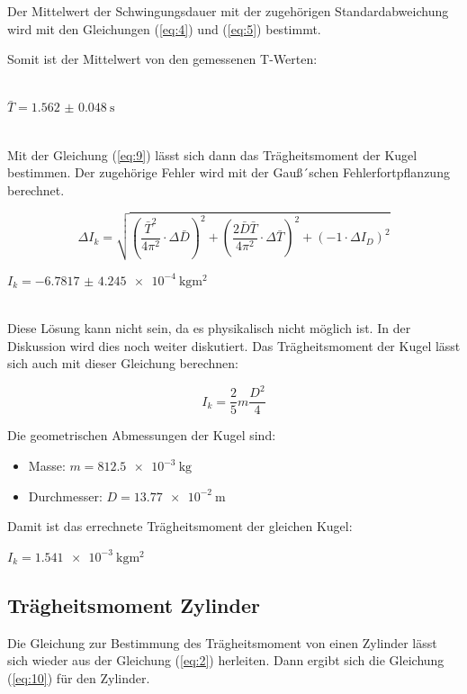 Der Mittelwert der Schwingungsdauer mit der zugehörigen Standardabweichung
wird mit den Gleichungen (\ref{eq:4}) und (\ref{eq:5}) bestimmt.

 Somit ist der Mittelwert von den gemessenen T-Werten:\\\\

 \centerline{$\bar{T} = \SI{1.562(48)}{\second}$}\ \\

 Mit der Gleichung (\ref{eq:9}) lässt sich dann das Trägheitsmoment der Kugel bestimmen. Der
 zugehörige Fehler wird mit der Gauß´schen Fehlerfortpflanzung berechnet.

\begin{equation}
 \Delta I_k = \sqrt{\left(\frac{\bar{T}^2}{4\pi^2} \cdot \Delta \bar{D} \right)^2
  + \left(\frac{2\bar{D}\bar{T}}{4\pi^2} \cdot \Delta \bar{T} \right)^2
   + \left( -1 \cdot \Delta I_D \right)^2}
   \label{eq:10}
\end{equation}

\centerline{$I_k = \SI{-6.7817(42450)e-4}{\kilo\gram\meter\squared}$}\ \\

Diese Lösung kann nicht sein, da es physikalisch nicht möglich ist. In der Diskussion
wird dies noch weiter diskutiert.
Das Trägheitsmoment der Kugel lässt sich auch mit dieser Gleichung berechnen:

\begin{equation}
I_k = \frac{2}{5} m \frac{D^2}{4}
\label{eq:11}
\end{equation}

Die geometrischen Abmessungen der Kugel sind:

\begin{itemize}
  \item Masse: $m = \SI{812.5e-3}{\kilo\gram}$
  \item Durchmesser: $D = \SI{13.77e-2}{\meter}$
\end{itemize}

Damit ist das errechnete Trägheitsmoment der gleichen Kugel:

\centerline{$I_k = \SI{1.541e-3}{\kilo\gram\meter\squared}$}

\subsection{Trägheitsmoment Zylinder}

Die Gleichung zur Bestimmung des Trägheitsmoment von einen Zylinder lässt sich wieder
aus der Gleichung (\ref{eq:2}) herleiten. Dann ergibt sich die Gleichung (\ref{eq:10}) für den Zylinder.


